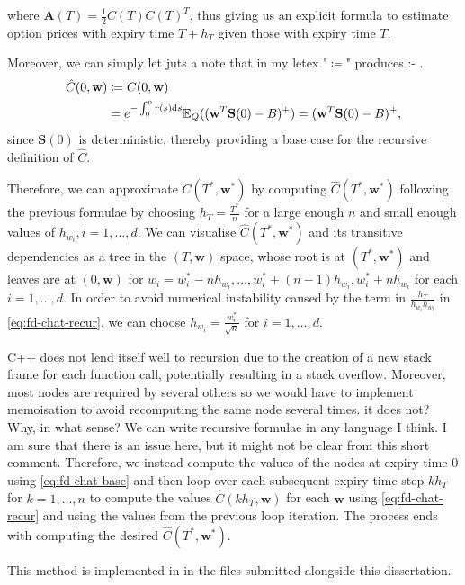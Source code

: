 \documentclass[english]{article}
\newcommand{\comment}[1]{\color{blue}#1\color{black}}
\numberwithin{equation}{section}
\numberwithin{figure}{section}
\theoremstyle{bolddescit}
\theoremstyle{definition}
\theoremstyle{definition}
\theoremstyle{plain}
\theoremstyle{plain}
\theoremstyle{bolddesc}
\theoremstyle{plain}
\theoremstyle{remark}
\begin{document}
where $\mathbf{A}(T) = \frac{1}{2} C(T) C(T)^T$, thus giving us an explicit formula to estimate option prices with expiry time $T+h_T$ given those with expiry time $T$.

Moreover, we can simply let
\comment{juts a note that in my letex "$\coloneq$" produces :- .}
\begin{align}
  \hat{C}(0, \mathbf{w})
  &\coloneq C(0, \mathbf{w})\notag\\
  &= e^{-\int_0^0 r(s) \mathrm{d}s} \mathbb{E}_Q((\mathbf{w}^T \mathbf{S}(0) - B)^+)
  = (\mathbf{w}^T \mathbf{S}(0) - B)^+,\label{eq:fd-chat-base}
\end{align}
since $\mathbf{S}(0)$ is deterministic, thereby providing a base case for the recursive definition of $\hat{C}$.

Therefore, we can approximate $C(T^*, \mathbf{w}^*)$ by computing $\hat{C}(T^*, \mathbf{w}^*)$ following the previous formulae by choosing $h_T = \frac{T^*}{n}$ for a large enough $n$ and small enough values of $h_{w_i}, i=1,\ldots,d$. We can visualise $\hat{C}(T^*, \mathbf{w}^*)$ and its transitive dependencies as a tree in the $(T,\mathbf{w})$ space, whose root is at $(T^*, \mathbf{w}^*)$ and leaves are at $(0,\mathbf{w})$ for $w_i = w_i^* - n h_{w_i}, \ldots, w_i^* + (n-1) h_{w_i}, w_i^* + n h_{w_i}$ for each $i=1,\ldots,d$. In order to avoid numerical instability caused by the term in $\frac{h_T}{h_{w_i} h_{w_l}}$ in \eqref{eq:fd-chat-recur}, we can choose $h_{w_i} = \frac{w_i^*}{\sqrt{n}}$ for $i=1,\ldots,d$.

C++ does not lend itself well to recursion due to the creation of a new stack frame for each function call, potentially resulting in a stack overflow. Moreover, most nodes are required by several others so we would have to implement memoisation to avoid recomputing the same node several times.
\comment{it does not? Why, in what sense? We can write recursive formulae in any language I think. I am sure that there is an issue here, but it might not be clear from this short comment.}
Therefore, we instead compute the values of the nodes at expiry time 0 using \eqref{eq:fd-chat-base} and then loop over each subsequent expiry time step $k h_T$ for $k=1,\ldots,n$ to compute the values $\hat{C}(k h_T, \mathbf{w})$ for each $\mathbf{w}$ using \eqref{eq:fd-chat-recur} and using the values from the previous loop iteration. The process ends with computing the desired $\hat{C}(T^*, \mathbf{w}^*)$.

This method is implemented in  in the files submitted alongside this dissertation.
\end{document}
